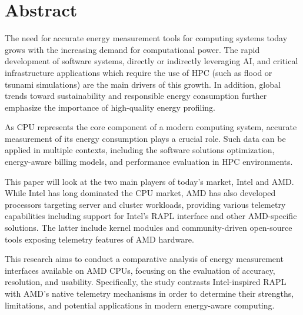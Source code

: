\section*{Abstract}

The need for accurate energy measurement tools for computing systems today
grows with the increasing demand for computational power. The rapid
development of software systems, directly or indirectly leveraging
\gls{AI}, and critical infrastructure applications which require the use of
\gls{HPC} (such as flood or tsunami simulations) are the main drivers of this
growth. In addition, global trends toward sustainability and responsible
energy consumption further emphasize the importance of high-quality energy
profiling.

As \gls{CPU} represents the core component of a modern computing system,
accurate measurement of its energy consumption plays a crucial role.
Such data can be applied in multiple contexts, including the software
solutions optimization, energy-aware billing models, and performance
evaluation in \gls{HPC} environments.

This paper will look at the two main players of today's market, Intel and AMD.
While Intel has long dominated the \gls{CPU} market, AMD has also developed
processors targeting server and cluster workloads, providing various telemetry
capabilities including support for Intel’s \gls{RAPL} interface and other
AMD-specific solutions. The latter include kernel modules and community-driven
open-source tools exposing telemetry features of AMD hardware.

This research aims to conduct a comparative analysis of energy measurement
interfaces available on AMD \gls{CPU}s, focusing on the evaluation of accuracy,
resolution, and usability. Specifically, the study contrasts Intel-inspired
\gls{RAPL} with AMD’s native telemetry mechanisms in order to determine their
strengths, limitations, and potential applications in modern energy-aware
computing.



